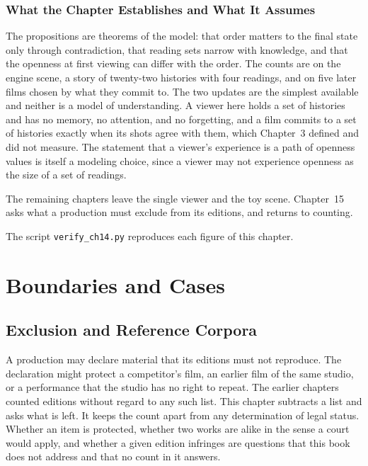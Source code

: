 \documentclass[11pt,twoside,openright]{book}
\theoremstyle{plain}
\theoremstyle{definition}
\theoremstyle{remark}
\begin{document}
\section{What the Chapter Establishes and What It Assumes}\label{sec:limits14}

The propositions are theorems of the model: that order matters to the final state only through contradiction, that reading sets narrow with knowledge, and that the openness at first viewing can differ with the order. The counts are on the engine scene, a story of twenty-two histories with four readings, and on five later films chosen by what they commit to. The two updates are the simplest available and neither is a model of understanding. A viewer here holds a set of histories and has no memory, no attention, and no forgetting, and a film commits to a set of histories exactly when its shots agree with them, which Chapter~3 defined and did not measure. The statement that a viewer's experience is a path of openness values is itself a modeling choice, since a viewer may not experience openness as the size of a set of readings.

The remaining chapters leave the single viewer and the toy scene. Chapter~15 asks what a production must exclude from its editions, and returns to counting.

The script \texttt{verify\_ch14.py} reproduces each figure of this chapter.

\part{Boundaries and Cases}

\chapter{Exclusion and Reference Corpora}
\label{ch:exclusion}

A production may declare material that its editions must not reproduce. The declaration might protect a competitor's film, an earlier film of the same studio, or a performance that the studio has no right to repeat. The earlier chapters counted editions without regard to any such list. This chapter subtracts a list and asks what is left. It keeps the count apart from any determination of legal status. Whether an item is protected, whether two works are alike in the sense a court would apply, and whether a given edition infringes are questions that this book does not address and that no count in it answers.
\end{document}

